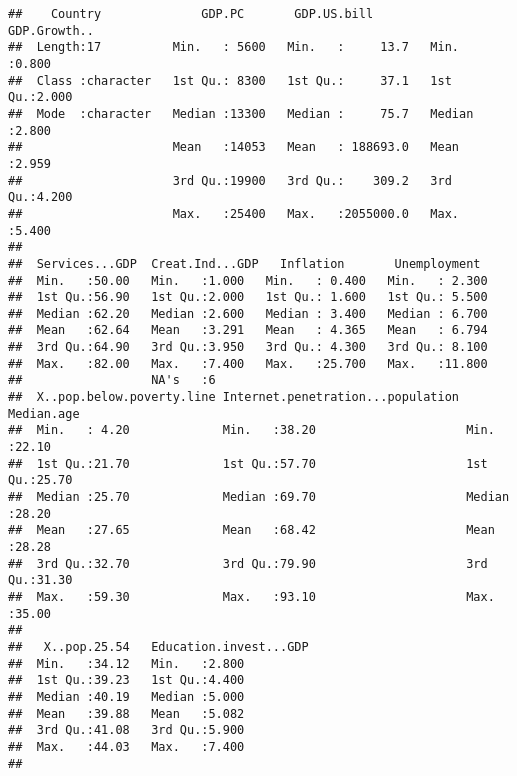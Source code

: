 \documentclass[
]{article}
\begin{document}
\begin{verbatim}
##    Country              GDP.PC       GDP.US.bill         GDP.Growth..  
##  Length:17          Min.   : 5600   Min.   :     13.7   Min.   :0.800  
##  Class :character   1st Qu.: 8300   1st Qu.:     37.1   1st Qu.:2.000  
##  Mode  :character   Median :13300   Median :     75.7   Median :2.800  
##                     Mean   :14053   Mean   : 188693.0   Mean   :2.959  
##                     3rd Qu.:19900   3rd Qu.:    309.2   3rd Qu.:4.200  
##                     Max.   :25400   Max.   :2055000.0   Max.   :5.400  
##                                                                        
##  Services...GDP  Creat.Ind...GDP   Inflation       Unemployment   
##  Min.   :50.00   Min.   :1.000   Min.   : 0.400   Min.   : 2.300  
##  1st Qu.:56.90   1st Qu.:2.000   1st Qu.: 1.600   1st Qu.: 5.500  
##  Median :62.20   Median :2.600   Median : 3.400   Median : 6.700  
##  Mean   :62.64   Mean   :3.291   Mean   : 4.365   Mean   : 6.794  
##  3rd Qu.:64.90   3rd Qu.:3.950   3rd Qu.: 4.300   3rd Qu.: 8.100  
##  Max.   :82.00   Max.   :7.400   Max.   :25.700   Max.   :11.800  
##                  NA's   :6                                        
##  X..pop.below.poverty.line Internet.penetration...population   Median.age   
##  Min.   : 4.20             Min.   :38.20                     Min.   :22.10  
##  1st Qu.:21.70             1st Qu.:57.70                     1st Qu.:25.70  
##  Median :25.70             Median :69.70                     Median :28.20  
##  Mean   :27.65             Mean   :68.42                     Mean   :28.28  
##  3rd Qu.:32.70             3rd Qu.:79.90                     3rd Qu.:31.30  
##  Max.   :59.30             Max.   :93.10                     Max.   :35.00  
##                                                                             
##   X..pop.25.54   Education.invest...GDP
##  Min.   :34.12   Min.   :2.800         
##  1st Qu.:39.23   1st Qu.:4.400         
##  Median :40.19   Median :5.000         
##  Mean   :39.88   Mean   :5.082         
##  3rd Qu.:41.08   3rd Qu.:5.900         
##  Max.   :44.03   Max.   :7.400         
## 
\end{verbatim}
\end{document}
